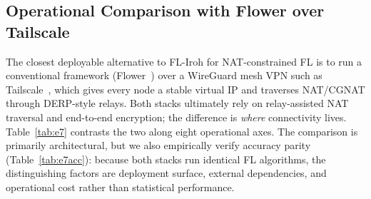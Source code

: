 \documentclass[a4paper,fleqn]{cas-dc}
\begin{document}
\subsection{Operational Comparison with Flower over Tailscale}
\label{sec:e7}

The closest deployable alternative to FL-Iroh for NAT-constrained FL is to run a conventional framework (Flower~\cite{flower2022}) over a WireGuard mesh VPN such as Tailscale~\cite{tailscale2023}, which gives every node a stable virtual IP and traverses NAT\slash CGNAT through DERP-style relays. Both stacks ultimately rely on relay-assisted NAT traversal and end-to-end encryption; the difference is \emph{where} connectivity lives. Table~\ref{tab:e7} contrasts the two along eight operational axes. The comparison is primarily architectural, but we also empirically verify accuracy parity (Table~\ref{tab:e7acc}): because both stacks run identical FL algorithms, the distinguishing factors are deployment surface, external dependencies, and operational cost rather than statistical performance.
\end{document}
